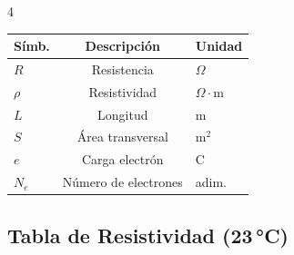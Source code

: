 \documentclass[9pt, landscape, letterpaper]{extarticle}
\begin{document}
\begin{multicols}{4}
  \begin{tablabox}[Variables]
    \tablacompacta
    \begin{tabular}{@{}lcl@{}}
      \toprule
      Símb.   & Descripción          & Unidad          \\
      \midrule
      $R$     & Resistencia          & $\Omega$        \\
      $\rho$  & Resistividad         & $\Omega \cdot$m \\
      $L$     & Longitud             & m               \\
      $S$     & Área transversal     & m$^2$           \\
      $e$     & Carga electrón       & C               \\
      $N_{e}$ & Número de electrones & adim.           \\
      \bottomrule
    \end{tabular}
  \end{tablabox}

  \subsection{Tabla de Resistividad (23\,°C)}


\end{multicols}
\end{document}
